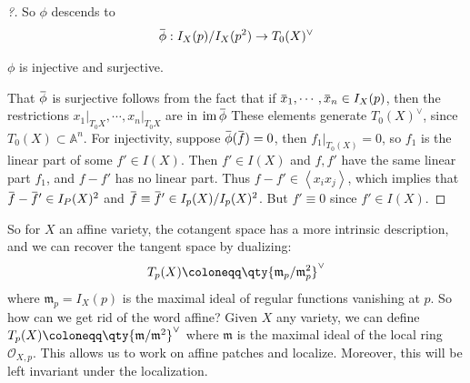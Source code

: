 \begin{proof}[?]
So \(\phi\) descends to
\begin{align*}
\mkern 1.5mu\overline{\mkern-1.5mu\phi\mkern-1.5mu}\mkern 1.5mu: I_X(p) / I_X(p^2) &\to T_0(X)^\vee\\
\end{align*}

\begin{claim}

\(\phi\) is injective and surjective.

\end{claim}

That \(\mkern 1.5mu\overline{\mkern-1.5mu\phi\mkern-1.5mu}\mkern 1.5mu\)
is surjective follows from the fact that if
\(\mkern 1.5mu\overline{\mkern-1.5mux\mkern-1.5mu}\mkern 1.5mu_1, \cdots, \mkern 1.5mu\overline{\mkern-1.5mux\mkern-1.5mu}\mkern 1.5mu_n \in I_X(p)\),
then the restrictions
\({ \left.{{x_1}} \right|_{{T_0X}} }, \cdots, { \left.{{x_n}} \right|_{{T_0X}} }\)
are in
\(\operatorname{im}\mkern 1.5mu\overline{\mkern-1.5mu\phi\mkern-1.5mu}\mkern 1.5mu\)
These elements generate \(T_0(X)^\vee\), since
\(T_0(X) \subset{\mathbb{A}}^n\). For injectivity, suppose
\(\mkern 1.5mu\overline{\mkern-1.5mu\phi\mkern-1.5mu}\mkern 1.5mu(\mkern 1.5mu\overline{\mkern-1.5muf\mkern-1.5mu}\mkern 1.5mu) = 0\),
then \({ \left.{{f_1}} \right|_{{T_0(X)}} } = 0\), so \(f_1\) is the
linear part of some \(f' \in I(X)\). Then \(f' \in I(X)\) and \(f, f'\)
have the same linear part \(f_1\), and \(f-f'\) has no linear part. Thus
\(f-f'\in \left\langle{x_i x_j}\right\rangle\), which implies that
\(\mkern 1.5mu\overline{\mkern-1.5muf\mkern-1.5mu}\mkern 1.5mu - \mkern 1.5mu\overline{\mkern-1.5muf\mkern-1.5mu}\mkern 1.5mu' \in I_P(X)^2\)
and
\(\mkern 1.5mu\overline{\mkern-1.5muf\mkern-1.5mu}\mkern 1.5mu \equiv \mkern 1.5mu\overline{\mkern-1.5muf\mkern-1.5mu}\mkern 1.5mu' \in I_p(X) / I_p(X)^2\).
But \(f' \equiv 0\) since \(f'\in I(X)\).

\end{proof}

\begin{remark}

So for \(X\) an affine variety, the cotangent space has a more intrinsic
description, and we can recover the tangent space by dualizing:
\begin{align*}  
T_p(X) \coloneqq\qty{\mathfrak{m}_p/\mathfrak{m}_p^2 }^\vee
\end{align*}
where \(\mathfrak{m}_p = I_X(p)\) is the maximal ideal of regular
functions vanishing at \(p\). So how can we get rid of the word affine?
Given \(X\) any variety, we can define
\(T_p(X) \coloneqq\qty{\mathfrak{m}/\mathfrak{m}^2}^\vee\) where
\(\mathfrak{m}\) is the maximal ideal of the local ring
\({\mathcal{O}}_{X, p}\). This allows us to work on affine patches and
localize. Moreover, this will be left invariant under the localization.

\end{remark}

